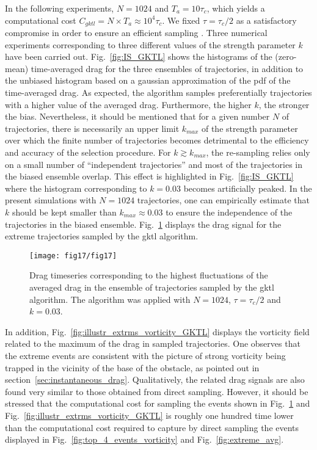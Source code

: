 In the following experiments, $N=1024$ and $T_a = 10\tau_c$, which yields a computational cost $C_{gktl} = N \times T_a \approx 10^4 \tau_c$. We fixed $\tau = \tau_c /2$ as a satisfactory compromise in order to ensure an efficient sampling \citep{lestang:tel-01974316}.
%
%
Three numerical experiments corresponding to three different values of the strength parameter $k$ have been carried out.
%
%
Fig.~\ref{fig:IS_GKTL} shows the histograms of the (zero-mean) time-averaged drag for the three ensembles of trajectories, in addition to the unbiased histogram based on a gaussian approximation of the \ac{pdf} of the time-averaged drag.
As expected, the algorithm samples preferentially trajectories with a higher value of the averaged drag. Furthermore, the higher $k$, the stronger the bias.
%
%
%
Nevertheless, it should be mentioned that for a given number $N$ of trajectories, there is necessarily an upper limit $k_{max}$ of the strength parameter over which the finite number of trajectories becomes detrimental to the efficiency and accuracy of the selection procedure.
%
For $k \gtrsim k_{max}$, the re-sampling relies only on a small number of ``independent trajectories'' and most of the trajectories in the biased ensemble overlap. 
This effect is highlighted in Fig.~\ref{fig:IS_GKTL} where the histogram corresponding to $k=0.03$ becomes artificially peaked.
%
In the present simulations with $N=1024$ trajectories, one can empirically estimate that  $k$ should be kept smaller than $k_{max} \approx 0.03$ to ensure the independence of the trajectories in the biased ensemble.
Fig.~\ref{fig:timeseries_extrms_AVG_GKTL} displays the drag signal for the extreme trajectories sampled by the \ac{gktl} algorithm.
\begin{figure}
	\centering
	\texttt{[image: fig17/fig17]}
	\caption{Drag timeseries corresponding to the highest fluctuations of the averaged drag in the ensemble of trajectories sampled  by the \ac{gktl} algorithm. The algorithm was applied with $N = 1024$, $\tau = \tau_c / 2$ and $k = 0.03$. }
	\label{fig:timeseries_extrms_AVG_GKTL}
\end{figure}
In addition, Fig.~\ref{fig:illustr_extrms_vorticity_GKTL} displays the vorticity field related to the maximum of the drag in sampled trajectories.
One observes that the extreme events are consistent with the picture of strong vorticity being trapped in the vicinity of the base of the obstacle, as pointed out in section~\ref{sec:instantaneous_drag}. Qualitatively, the related drag signals are also found very similar to those obtained from direct sampling. 
However, it should be stressed that the computational cost for sampling the events shown in Fig.~\ref{fig:timeseries_extrms_AVG_GKTL} and Fig.~\ref{fig:illustr_extrms_vorticity_GKTL} is roughly one hundred time lower than the computational cost required to capture by direct sampling the events displayed in  Fig.~\ref{fig:top_4_events_vorticity} and Fig.~\ref{fig:extreme_avg}.

